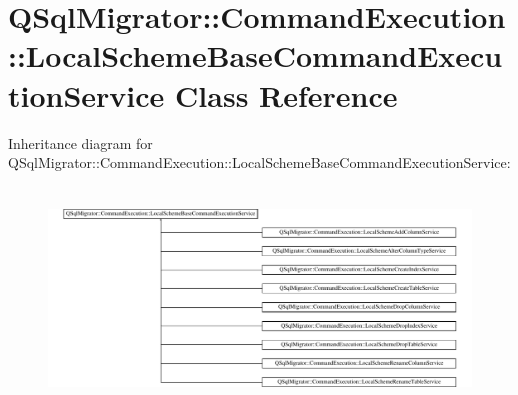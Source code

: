 \hypertarget{class_q_sql_migrator_1_1_command_execution_1_1_local_scheme_base_command_execution_service}{}\section{Q\+Sql\+Migrator\+:\+:Command\+Execution\+:\+:Local\+Scheme\+Base\+Command\+Execution\+Service Class Reference}
\label{class_q_sql_migrator_1_1_command_execution_1_1_local_scheme_base_command_execution_service}
Inheritance diagram for Q\+Sql\+Migrator\+:\+:Command\+Execution\+:\+:Local\+Scheme\+Base\+Command\+Execution\+Service\+:\begin{figure}[H]
\begin{center}
\leavevmode
\includegraphics[height=5.894737cm]{class_q_sql_migrator_1_1_command_execution_1_1_local_scheme_base_command_execution_service}
\end{center}
\end{figure}
